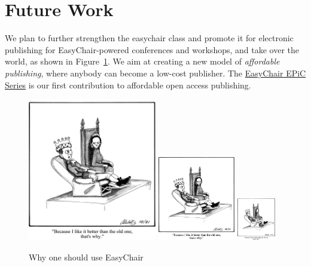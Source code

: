 \documentclass{easychair}
\newcommand{\easychair}{\textsf{easychair}}
\begin{document}
\section{Future Work}
\label{sect:future-work}

We plan to further strengthen the {\easychair} class and promote it for 
electronic publishing for EasyChair-powered conferences and workshops,
and take over the world, as shown in Figure~\ref{fig:easythrone}. We
aim at creating a new model of \emph{affordable publishing}, where
anybody can become a low-cost publisher. The
\href{http://www.easychair.org/publications/EPiC}{EasyChair EPiC Series} is our
first contribution to affordable open access publishing.

\begin{figure}[tb]
  \begin{centering}
    \includegraphics[width=0.5\textwidth]{throneEC.jpg}
    \includegraphics[width=0.3\textwidth]{throneEC.jpg}
    \includegraphics[width=0.15\textwidth]{throneEC.jpg}
  \end{centering}
  \caption{Why one should use EasyChair}
  \label{fig:easythrone}
\end{figure}
\end{document}
